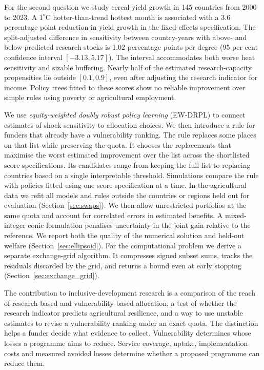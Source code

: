 For the second question we study cereal-yield growth in 145 countries from 2000 to 2023. A
$1^{\circ}$C hotter-than-trend hottest month is associated with a 3.6 percentage point reduction in
yield growth in the fixed-effects specification. The split-adjusted difference in sensitivity
between country-years with above- and below-predicted research stocks is 1.02 percentage points
per degree (95 per cent confidence interval $[-3.13,5.17]$). The interval accommodates both
worse heat sensitivity and sizable buffering. Nearly half of the estimated research-capacity
propensities lie outside $[0.1,0.9]$, even after adjusting the research indicator for income.
Policy trees fitted to these scores show no reliable improvement over simple rules using
poverty or agricultural employment.

We use \emph{equity-weighted doubly robust policy learning} (EW-DRPL) to connect estimates of
shock sensitivity to allocation choices. We then introduce a rule for funders that already
have a vulnerability ranking. The rule replaces some places on that list while preserving
the quota. It chooses the replacements that maximise the worst estimated improvement over
the list across the shortlisted score specifications. Its candidates range from keeping
the full list to replacing countries based on a single interpretable threshold.
Simulations compare the rule with policies fitted using one score specification at a time.
In the agricultural data we refit all models and rules outside the countries or regions
held out for evaluation (Section~\ref{sec:swaps}). We then allow unrestricted
portfolios at the same quota and account for correlated errors in estimated benefits.
A mixed-integer conic formulation penalises uncertainty in the joint gain relative
to the reference. We report both the quality of the numerical solution and held-out
welfare (Section~\ref{sec:ellipsoid}). For the computational problem we derive a
separate exchange-grid algorithm. It compresses signed subset sums, tracks the
residuals discarded by the grid, and returns a bound even at early stopping
(Section~\ref{sec:exchange_grid}).

The contribution to inclusive-development research is a comparison of the reach of
research-based and vulnerability-based allocation, a test of whether the research indicator
predicts agricultural resilience, and a way to use unstable estimates to revise a
vulnerability ranking under an exact quota. The distinction helps a funder decide what
evidence to collect. Vulnerability determines whose losses a programme aims to reduce.
Service coverage, uptake, implementation costs and measured avoided losses determine
whether a proposed programme can reduce them.

